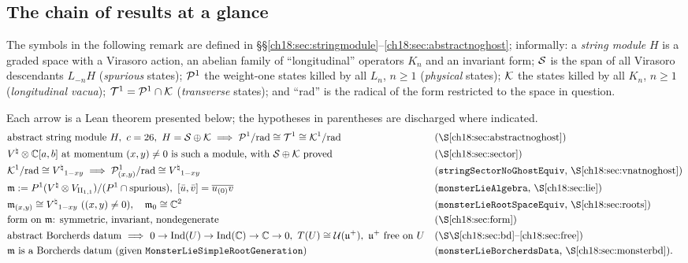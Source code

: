 \subsection{The chain of results at a glance}\label{ch18:sec:chain}

The symbols in the following remark are defined in \S\S\ref{ch18:sec:stringmodule}--\ref{ch18:sec:abstractnoghost}; informally:
a \emph{string module} $H$ is a graded space with a Virasoro action, an abelian family of ``longitudinal'' operators
$K_n$ and an invariant form; $\mathcal{S}$ is the span of all Virasoro descendants $L_{-n}H$ (\emph{spurious} states);
$\mathcal{P}^1$ the weight-one states killed by all $L_n$, $n\ge1$ (\emph{physical} states); $\mathcal{K}$ the states killed by all
$K_n$, $n\ge1$ (\emph{longitudinal vacua}); $\mathcal{T}^1=\mathcal{P}^1\cap\mathcal{K}$ (\emph{transverse} states); and ``rad'' is the radical
of the form restricted to the space in question.

\begin{remark}\label{ch18:rem:chain}
Each arrow is a Lean theorem presented below; the hypotheses in parentheses are discharged where
indicated.
\begin{align*}
  &\text{abstract string module } H,\ c=26,\ H=\chXVIIIS\oplus\chXVIIIK
   \;\Longrightarrow\; \chXVIIIP^1/\mathrm{rad}\cong \chXVIIIT^1\cong \chXVIIIK^1/\mathrm{rad}
   && \text{(\S\ref{ch18:sec:abstractnoghost})}\\
  &\Vnat\otimes\mathbb C[a,b]\text{ at momentum }(x,y)\neq0
   \text{ is such a module, with } \chXVIIIS\oplus\chXVIIIK \text{ proved}
   && \text{(\S\ref{ch18:sec:sector})}\\
  &\chXVIIIK^1/\mathrm{rad}\cong\Vnat_{1-xy}
   \;\Longrightarrow\;
   \chXVIIIP^1_{(x,y)}/\mathrm{rad}\cong \Vnat_{1-xy}
   && \text{(\lean{stringSectorNoGhostEquiv}, \S\ref{ch18:sec:vnatnoghost})}\\
  &\chXVIIIm := P^1(\Vnat\otimes V_{\chXVIIIII})/(P^1\cap\text{spurious}),\
   [\bar u,\bar v]=\overline{u_{(0)}v}
   && \text{(\lean{monsterLieAlgebra}, \S\ref{ch18:sec:lie})}\\
  &\chXVIIIm_{(x,y)}\cong\Vnat_{1-xy}\ ((x,y)\neq0),\quad \chXVIIIm_0\cong\mathbb C^2
   && \text{(\lean{monsterLieRootSpaceEquiv}, \S\ref{ch18:sec:roots})}\\
  &\text{form on }\chXVIIIm\text{: symmetric, invariant, nondegenerate}
   && \text{(\S\ref{ch18:sec:form})}\\
  &\text{abstract Borcherds datum }\Longrightarrow\ 0\to \mathrm{Ind}(U)\to \mathrm{Ind}(\mathbb C)\to\mathbb C\to0,\
   T(U)\cong \mathcal U(\chXVIIIu^+),\ \chXVIIIu^+ \text{ free on } U
   && \text{(\S\S\ref{ch18:sec:bd}--\ref{ch18:sec:free})}\\
  &\chXVIIIm\text{ is a Borcherds datum } (\text{given } \lean{MonsterLieSimpleRootGeneration})
   && \text{(\lean{monsterLieBorcherdsData}, \S\ref{ch18:sec:monsterbd})}.
\end{align*}
\end{remark}

